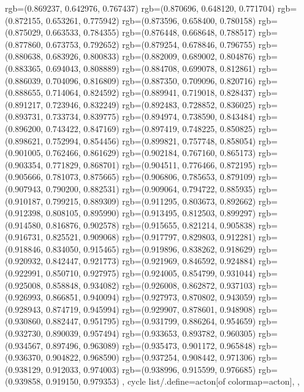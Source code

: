 {{{					rgb=(0.869237, 0.642976, 0.767437)
					rgb=(0.870696, 0.648120, 0.771704)
					rgb=(0.872155, 0.653261, 0.775942)
					rgb=(0.873596, 0.658400, 0.780158)
					rgb=(0.875029, 0.663533, 0.784355)
					rgb=(0.876448, 0.668648, 0.788517)
					rgb=(0.877860, 0.673753, 0.792652)
					rgb=(0.879254, 0.678846, 0.796755)
					rgb=(0.880638, 0.683926, 0.800833)
					rgb=(0.882009, 0.689002, 0.804876)
					rgb=(0.883365, 0.694043, 0.808889)
					rgb=(0.884708, 0.699078, 0.812861)
					rgb=(0.886039, 0.704096, 0.816809)
					rgb=(0.887350, 0.709096, 0.820716)
					rgb=(0.888655, 0.714064, 0.824592)
					rgb=(0.889941, 0.719018, 0.828437)
					rgb=(0.891217, 0.723946, 0.832249)
					rgb=(0.892483, 0.728852, 0.836025)
					rgb=(0.893731, 0.733734, 0.839775)
					rgb=(0.894974, 0.738590, 0.843484)
					rgb=(0.896200, 0.743422, 0.847169)
					rgb=(0.897419, 0.748225, 0.850825)
					rgb=(0.898621, 0.752994, 0.854456)
					rgb=(0.899821, 0.757748, 0.858054)
					rgb=(0.901005, 0.762466, 0.861629)
					rgb=(0.902184, 0.767160, 0.865173)
					rgb=(0.903354, 0.771829, 0.868701)
					rgb=(0.904511, 0.776466, 0.872195)
					rgb=(0.905666, 0.781073, 0.875665)
					rgb=(0.906806, 0.785653, 0.879109)
					rgb=(0.907943, 0.790200, 0.882531)
					rgb=(0.909064, 0.794722, 0.885935)
					rgb=(0.910187, 0.799215, 0.889309)
					rgb=(0.911295, 0.803673, 0.892662)
					rgb=(0.912398, 0.808105, 0.895990)
					rgb=(0.913495, 0.812503, 0.899297)
					rgb=(0.914580, 0.816876, 0.902578)
					rgb=(0.915655, 0.821214, 0.905838)
					rgb=(0.916731, 0.825521, 0.909068)
					rgb=(0.917797, 0.829803, 0.912281)
					rgb=(0.918846, 0.834050, 0.915465)
					rgb=(0.919896, 0.838262, 0.918629)
					rgb=(0.920932, 0.842447, 0.921773)
					rgb=(0.921969, 0.846592, 0.924884)
					rgb=(0.922991, 0.850710, 0.927975)
					rgb=(0.924005, 0.854799, 0.931044)
					rgb=(0.925008, 0.858848, 0.934082)
					rgb=(0.926008, 0.862872, 0.937103)
					rgb=(0.926993, 0.866851, 0.940094)
					rgb=(0.927973, 0.870802, 0.943059)
					rgb=(0.928943, 0.874719, 0.945994)
					rgb=(0.929907, 0.878601, 0.948908)
					rgb=(0.930860, 0.882447, 0.951795)
					rgb=(0.931799, 0.886264, 0.954659)
					rgb=(0.932730, 0.890039, 0.957494)
					rgb=(0.933653, 0.893782, 0.960305)
					rgb=(0.934567, 0.897496, 0.963089)
					rgb=(0.935473, 0.901172, 0.965848)
					rgb=(0.936370, 0.904822, 0.968590)
					rgb=(0.937254, 0.908442, 0.971306)
					rgb=(0.938129, 0.912033, 0.974003)
					rgb=(0.938996, 0.915599, 0.976685)
					rgb=(0.939858, 0.919150, 0.979353)
			},
		cycle list/.define={acton}{[of colormap=acton]},
		},
}
